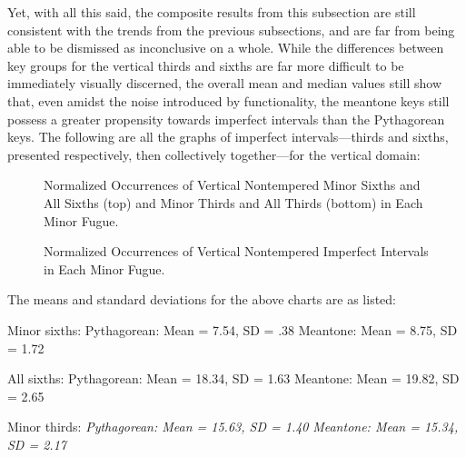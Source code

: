 Yet, with all this said, the composite results from this subsection are
still consistent with the trends from the previous subsections, and are
far from being able to be dismissed as inconclusive on a whole. While
the differences between key groups for the vertical thirds and sixths
are far more difficult to be immediately visually discerned, the overall
mean and median values still show that, even amidst the noise introduced
by functionality, the meantone keys still possess a greater propensity
towards imperfect intervals than the Pythagorean keys. The following are
all the graphs of imperfect intervals---thirds and sixths, presented
respectively, then collectively together---for the vertical domain:


    \begin{center}
    \end{center}
    


\begin{figure}[H]
    \begin{center}
    \caption[Normalized Occurrences of Vertical Nontempered Thirds and Sixths in Each Minor Fugue. ]{Normalized Occurrences of Vertical Nontempered Minor Sixths and All Sixths (top) and Minor Thirds and All Thirds (bottom) in Each Minor Fugue.}
    \end{center}
\end{figure}
    



\begin{figure}[H]
    \begin{center}
    \caption{Normalized Occurrences of Vertical Nontempered Imperfect Intervals in Each Minor Fugue. }
    \end{center}
\end{figure}
    
    The means and standard deviations for the above charts are as listed:

Minor sixths: Pythagorean: Mean = 7.54, SD = .38 Meantone: Mean = 8.75,
SD = 1.72

All sixths: Pythagorean: Mean = 18.34, SD = 1.63 Meantone: Mean = 19.82,
SD = 2.65

Minor thirds: \emph{Pythagorean: Mean = 15.63, SD = 1.40}
\emph{Meantone: Mean = 15.34, SD = 2.17}

